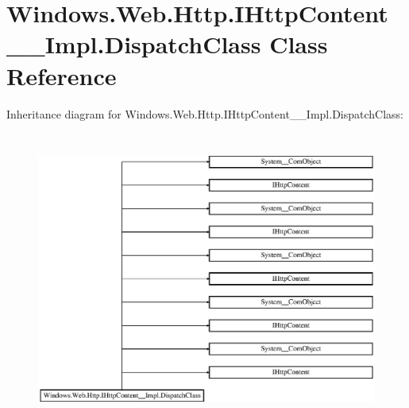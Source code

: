 \hypertarget{class_windows_1_1_web_1_1_http_1_1_i_http_content_____impl_1_1_dispatch_class}{}\section{Windows.\+Web.\+Http.\+I\+Http\+Content\+\_\+\+\_\+\+Impl.\+Dispatch\+Class Class Reference}
\label{class_windows_1_1_web_1_1_http_1_1_i_http_content_____impl_1_1_dispatch_class}
Inheritance diagram for Windows.\+Web.\+Http.\+I\+Http\+Content\+\_\+\+\_\+\+Impl.\+Dispatch\+Class\+:\begin{figure}[H]
\begin{center}
\leavevmode
\includegraphics[height=9.716088cm]{class_windows_1_1_web_1_1_http_1_1_i_http_content_____impl_1_1_dispatch_class}
\end{center}
\end{figure}
